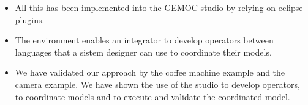 \begin{itemize}
	\item All this has been implemented into the GEMOC studio by relying on eclipse plugins. 
	
	\item The environment enables an integrator to develop operators between languages that a sistem designer can use to coordinate their models. 
	
	\item We have validated our approach by the coffee machine example and the camera example. We have shown the use of the studio to develop operators, to coordinate models and to execute and validate the coordinated model. 
	 



\end{itemize}

